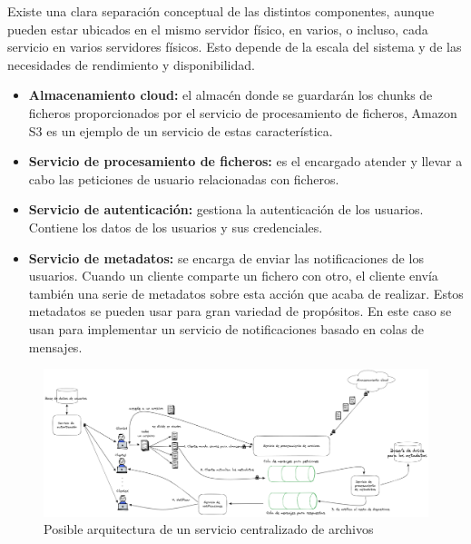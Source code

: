 Existe una clara separación conceptual de las distintos componentes, aunque pueden estar ubicados en
el mismo servidor físico, en varios, o incluso, cada servicio en varios servidores físicos. Esto depende de la escala
del sistema y de las necesidades de rendimiento y disponibilidad.

\begin{itemize}[noitemsep,after=\vspace{-0.4\baselineskip}]
  \item \textbf{Almacenamiento cloud:} el almacén donde se guardarán los chunks de ficheros proporcionados por el servicio
        de procesamiento de ficheros, Amazon S3 es un ejemplo de un servicio de estas característica.
        \item\textbf{Servicio de procesamiento de ficheros:} es el encargado atender y llevar a cabo las peticiones de usuario relacionadas con ficheros.
  \item \textbf{Servicio de autenticación:} gestiona la autenticación de los usuarios. Contiene los datos de los usuarios y sus credenciales.
  \item \textbf{Servicio de metadatos:} se encarga de enviar las notificaciones de los usuarios. Cuando un cliente
        comparte un fichero con otro, el cliente envía también una serie de metadatos sobre esta acción que acaba de realizar.
        Estos metadatos se pueden usar para gran variedad de propósitos. En este caso se usan para implementar un servicio de notificaciones basado en colas de mensajes.
\end{itemize}
\begin{figure}
  \centering
  \includegraphics[width=\textwidth]{images/diagramacentral.png}
  \caption{Posible arquitectura de un servicio centralizado de archivos}
  \label{fig:centralizedarch}
\end{figure}


